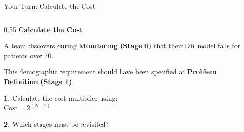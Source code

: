 \documentclass[aspectratio=169, 12pt]{beamer}
\begin{document}
\begin{frame}{Your Turn: Calculate the Cost}
\note{
%
%
%
%
}

\small
\begin{columns}[T]
  \begin{column}{0.55\textwidth}
    {\normalsize\bfseries Calculate the Cost}

    \vspace{0.15cm}
    A team discovers during \textbf{Monitoring (Stage 6)} that their DR model fails for patients over 70.

    \vspace{0.1cm}
    This demographic requirement should have been specified at \textbf{Problem Definition (Stage 1)}.

    \vspace{0.15cm}
    \textbf{1.} Calculate the cost multiplier using:\\
    \hspace{1em}$\text{Cost} = 2^{(N-1)}$

    \vspace{0.1cm}
    \textbf{2.} Which stages must be revisited?


\end{column}
\end{columns}
\end{frame}
\end{document}
